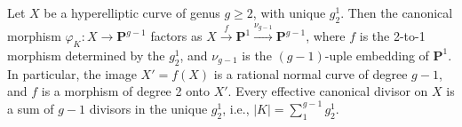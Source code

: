 Let $X$ be a hyperelliptic curve of genus $g \geqslant 2$, with unique $g_2^1$. Then the canonical morphism $\varphi_K: X \to \mathbf{P}^{g-1}$ factors as $X \xrightarrow{f} \mathbf{P}^1 \xrightarrow{\nu_{g-1}} \mathbf{P}^{g-1}$, where $f$ is the 2-to-1 morphism determined by the $g_2^1$, and $\nu_{g-1}$ is the $(g-1)$-uple embedding of $\mathbf{P}^1$. In particular, the image $X' = f(X)$ is a rational normal curve of degree $g-1$, and $f$ is a morphism of degree 2 onto $X'$. Every effective canonical divisor on $X$ is a sum of $g-1$ divisors in the unique $g_2^1$, i.e., $|K| = \sum_{1}^{g-1} g_2^1$.
